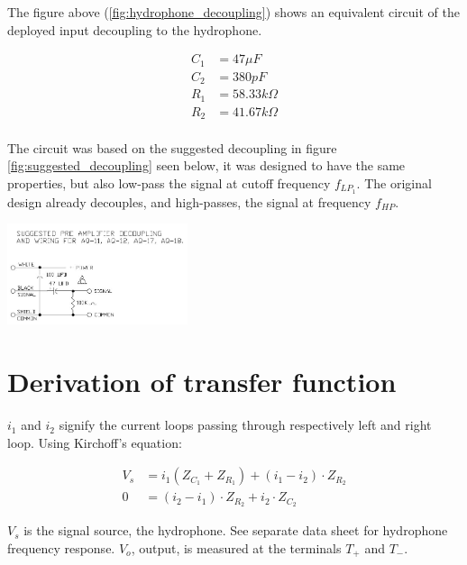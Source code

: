 \documentclass[a4paper]{article}
\begin{document}
\begin{multicols}{2}
The figure above (\ref{fig:hydrophone_decoupling}) shows an equivalent
circuit of the deployed input decoupling to the hydrophone.


\begin{align*}
  C_1 &= 47 \mu F \\
  C_2 &= 380 pF \\
  R_1 &= 58.33 k \Omega \\
  R_2 &= 41.67 k \Omega
\end{align*}

\paragraph{}The circuit was based on the suggested decoupling in figure
\ref{fig:suggested_decoupling} seen below, it was designed to have the
same properties, but also low-pass the signal at cutoff frequency
$f_{LP_1}$. The original design already decouples, and high-passes, the
signal at frequency $f_{HP}$.

  \begin{center}
    \includegraphics[width=200px]{AQ-18-decoupling-and-wiring.jpg}
  \end{center}
  \label{fig:suggested_decoupling}

\section{Derivation of transfer function}

$i_1$ and $i_2$ signify the current loops passing through respectively left
and right loop. Using Kirchoff's equation:

\begin{align}
  \label{eqn:currents_1}
  V_s &= i_1 (Z_{C_1} + Z_{R_1}) + (i_1 - i_2) \cdot Z_{R_2} \\
  0   &= (i_2 - i_1) \cdot Z_{R_2} + i_2 \cdot Z_{C_2}
  \label{eqn:currents_2}
\end{align}

$V_s$ is the signal source, the hydrophone. See separate data sheet for
hydrophone frequency response. $V_o$, output, is measured at the
terminals $T_+$ and $T_-$.


\end{multicols}
\end{document}
